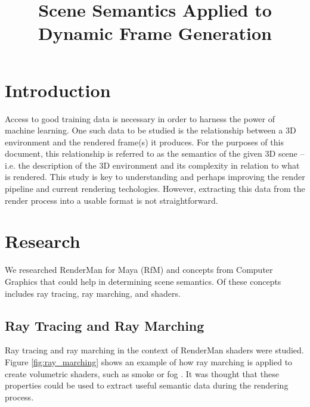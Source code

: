 \documentclass[conference]{IEEEtran}
\begin{document}
\title{Scene Semantics Applied to \\ Dynamic Frame Generation}

\author{
}

\maketitle

\begin{abstract}
\end{abstract}

\section{Introduction}
\label{sec:introduction}
Access to good training data is necessary
in order to harness the power of machine learning.
One such data to be studied is the relationship
between a 3D environment and the
rendered frame(s) it produces.
For the purposes of this document, this relationship is
referred to as the semantics of the given 3D scene --
i.e. the description of the 3D environment and its complexity
in relation to what is rendered.
This study is key to understanding and perhaps improving the
render pipeline and current rendering techologies.
However, extracting this data from the render process into a usable
format is not straightforward.

\section{Research}
We researched RenderMan for Maya (RfM) and concepts from Computer Graphics
that could help in determining scene semantics.
Of these concepts includes ray tracing, ray marching, and shaders.

\subsection{Ray Tracing and Ray Marching}
Ray tracing and ray marching in the context of RenderMan shaders were studied.
Figure \ref{fig:ray_marching} shows an example of how ray marching is applied to
create volumetric shaders, such as smoke or fog \cite{ray_marching}.
It was thought that these properties could be used to extract useful semantic data
during the rendering process.
\end{document}

